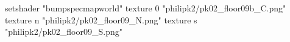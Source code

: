setshader "bumpspecmapworld"
    texture 0 "philipk2/pk02_floor09b_C.png"
    texture n "philipk2/pk02_floor09_N.png"
    texture s "philipk2/pk02_floor09_S.png"